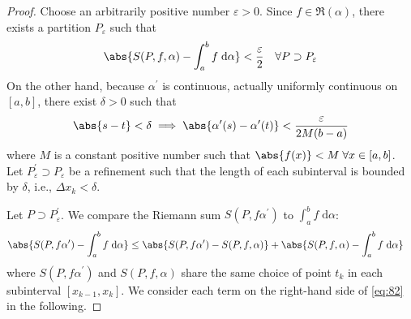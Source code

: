 \documentclass[thmcnt=section, 12pt]{elegantbook}
\begin{document}
\begin{proof}
    Choose an arbitrarily positive number $\varepsilon > 0$. Since $f \in \mathfrak{R}(\alpha)$, there exists a partition $P_\varepsilon$ such that 
    \begin{align}
        \abs{S(P, f, \alpha) - \int_a^b f \; \mathrm{d}\alpha} < \frac{\varepsilon}{2}
        \quad \forall P \supset P_\varepsilon
        \label{eq:80}
    \end{align}
    On the other hand, because $\alpha^\prime$ is continuous, actually uniformly continuous on $[a, b]$, there exist $\delta > 0$ such that 
    \begin{align}
        \abs{s - t} < \delta
        \implies \abs{\alpha^\prime(s) - \alpha^\prime(t)} < \frac{\varepsilon}{2M(b-a)}
        \label{eq:81}
    \end{align}
    where $M$ is a constant positive number such that $\abs{f(x)} < M \; \forall x \in [a, b]$. Let $P^\prime_\varepsilon \supset P_\varepsilon$ be a refinement such that the length of each subinterval is bounded by $\delta$, i.e., $\Delta x_k < \delta$.

    \par Let $P \supset P^\prime_\varepsilon$. We compare the Riemann sum $S(P, f \alpha^\prime)$ to $\int_a^b f \; \mathrm{d}\alpha$:
    \begin{align}
        \abs{
            S(P, f \alpha^\prime)
            - \int_a^b f \; \mathrm{d}\alpha
        } &\leq \abs{
            S(P, f \alpha^\prime)
            - S(P, f, \alpha)
        } + \abs{
            S(P, f, \alpha)
            - \int_a^b f \; \mathrm{d}\alpha
        }
        \label{eq:82}
    \end{align}
    where $S(P, f \alpha^\prime)$ and $S(P, f, \alpha)$ share the same choice of point $t_k$ in each subinterval $[x_{k-1}, x_k]$. We consider each term on the right-hand side of \eqref{eq:82} in the following.


\end{proof}
\end{document}
